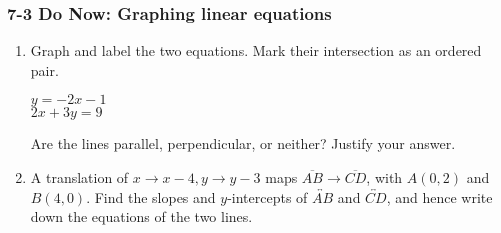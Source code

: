 \documentclass[12pt, twoside]{article}
\begin{document}
\subsubsection*{7-3 Do Now: Graphing linear equations}
  \begin{enumerate}

\item Graph and label the two equations. Mark their intersection as an ordered pair.

  \begin{multicols}{2}
    $y = -2x-1$ \\
    $2x+3y = 9$
  \end{multicols}
  Are the lines parallel, perpendicular, or neither? Justify your answer.
  \vspace{1.5cm}

  \begin{center} %
  \end{center}


    \item A translation of $x \rightarrow x-4, y \rightarrow y-3$ maps $\overline{AB} \rightarrow \overline{CD}$, with $A(0,2)$ and $B(4,0)$. Find the slopes and $y$-intercepts of $\overleftrightarrow{AB}$ and $\overleftrightarrow{CD}$, and hence write down the equations of the two lines.

  \end{enumerate}
  \setcounter{page}{1}
  \newpage
\end{document}
